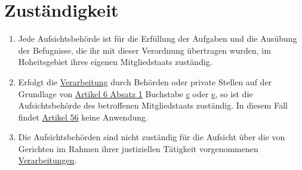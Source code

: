\chapter{Zuständigkeit}
\label{ch:55}


\begin{enumerate}

  \item Jede Aufsichtsbehörde ist für die Erfüllung der Aufgaben und die Ausübung der Befugnisse, die ihr mit dieser
   Verordnung übertragen wurden, im Hoheitsgebiet ihres eigenen Mitgliedstaats zuständig.
  \label{itm:55-1}

  \item Erfolgt die \hyperref[itm:04-2]{Verarbeitung} durch Behörden oder private Stellen auf der Grundlage von \hyperref[itm:06-1]{Artikel 6
   Absatz 1} Buchstabe \hyperref[itm:06-1c]{c} oder \hyperref[itm:06-1e]{e}, so ist die Aufsichtsbehörde des
   betroffenen Mitgliedstaats zuständig. In diesem Fall findet \hyperref[ch:56]{Artikel 56} keine Anwendung.
  \label{itm:55-2}

  \item Die Aufsichtsbehörden sind nicht zuständig für die Aufsicht über die von Gerichten im Rahmen ihrer justiziellen
   Tätigkeit vorgenommenen \hyperref[itm:04-2]{Verarbeitungen}.
  \label{itm:55-3}

\end{enumerate}


